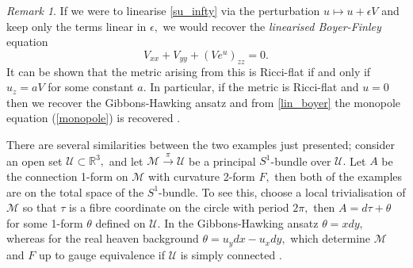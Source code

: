 \documentclass[a4paper,12pt, onecolumn, notitlepage]{article}
\theoremstyle{definition}
\theoremstyle{remark}
\newtheorem{rmk}[thm]{Remark}
\newcommand{\e}{\epsilon}
\begin{document}
\begin{rmk}
	If we were to linearise \cref{su_infty} via the perturbation $u\mapsto u + \e V$ and keep only the terms linear in $\e,$ we would recover the \emph{linearised Boyer-Finley} equation
	\begin{equation}
		\label{lin_boyer}
		V_{xx} + V_{yy} + (Ve^{u})_{zz}=0. 
	\end{equation}
	It can be shown that the metric arising from this is Ricci-flat if and only if $u_{z} = aV$ for some constant $a.$ In particular, if the metric is Ricci-flat and $u=0$ then we recover the Gibbons-Hawking ansatz and from \cref{lin_boyer} the monopole equation (\ref{monopole}) is recovered \cite{lebrun_1991}.\\
\end{rmk}

There are several similarities between the two examples just presented; consider an open set $\mathcal{U}\subset\mathbb{R}^{3},$ and let $\mathcal{M}\overset{\pi}{\rightarrow}\mathcal{U}$ be a principal $S^{1}$-bundle over $\mathcal{U}.$ Let $A$ be the connection 1-form on $\mathcal{M}$ with curvature 2-form $F,$ then both of the examples are on the total space of the $S^{1}$-bundle. To see this, choose a local trivialisation of $\mathcal{M}$ so that $\tau$ is a fibre coordinate on the circle with period $2\pi,$ then $A=d\tau + \theta$ for some 1-form $\theta$ defined on $\mathcal{U}.$ In the Gibbons-Hawking ansatz $\theta = xdy,$ whereas for the real heaven background $\theta = u_{y}dx - u_{x}dy,$ which determine $\mathcal{M}$ and $F$ up to gauge equivalence if $\mathcal{U}$ is simply connected \cite{lebrun_1991}.

\end{document}
